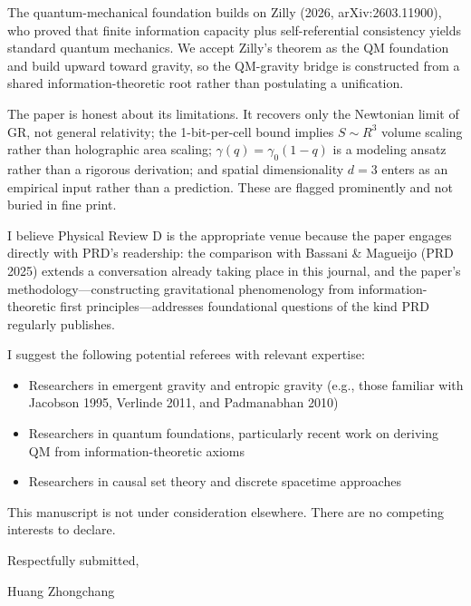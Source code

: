 \documentclass[12pt]{article}
\begin{document}
The quantum-mechanical foundation builds on Zilly (2026, arXiv:2603.11900), who proved that finite information capacity plus self-referential consistency yields standard quantum mechanics. We accept Zilly's theorem as the QM foundation and build upward toward gravity, so the QM-gravity bridge is constructed from a shared information-theoretic root rather than postulating a unification.

The paper is honest about its limitations. It recovers only the Newtonian limit of GR, not general relativity; the 1-bit-per-cell bound implies $S\sim R^3$ volume scaling rather than holographic area scaling; $\gamma(q)=\gamma_0(1-q)$ is a modeling ansatz rather than a rigorous derivation; and spatial dimensionality $d=3$ enters as an empirical input rather than a prediction. These are flagged prominently and not buried in fine print.

I believe Physical Review D is the appropriate venue because the paper engages directly with PRD's readership: the comparison with Bassani \& Magueijo (PRD 2025) extends a conversation already taking place in this journal, and the paper's methodology---constructing gravitational phenomenology from information-theoretic first principles---addresses foundational questions of the kind PRD regularly publishes.

I suggest the following potential referees with relevant expertise:
\begin{itemize}[nosep,leftmargin=*]
    \item Researchers in emergent gravity and entropic gravity (e.g., those familiar with Jacobson 1995, Verlinde 2011, and Padmanabhan 2010)
    \item Researchers in quantum foundations, particularly recent work on deriving QM from information-theoretic axioms
    \item Researchers in causal set theory and discrete spacetime approaches
\end{itemize}

This manuscript is not under consideration elsewhere. There are no competing interests to declare.

\vspace{0.15in}

\noindent
Respectfully submitted,

\vspace{0.3in}

\noindent
Huang Zhongchang
\end{document}
